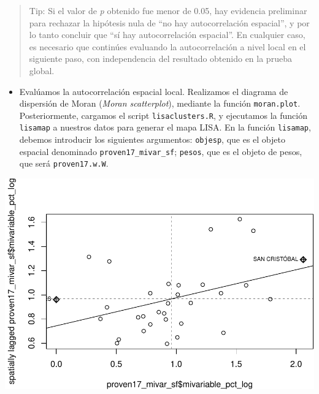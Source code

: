 \documentclass[11pt,]{article}
\newenvironment{Shaded}{\begin{snugshade}}{\end{snugshade}}
\newcommand{\KeywordTok}[1]{\textcolor[rgb]{0.13,0.29,0.53}{\textbf{#1}}}
\newcommand{\DataTypeTok}[1]{\textcolor[rgb]{0.13,0.29,0.53}{#1}}
\newcommand{\OperatorTok}[1]{\textcolor[rgb]{0.81,0.36,0.00}{\textbf{#1}}}
\newcommand{\NormalTok}[1]{#1}
\providecommand{\tightlist}{%
\setlength{\itemsep}{0pt}\setlength{\parskip}{0pt}}
\begin{document}
\begin{quote}
Tip: Si el valor de \emph{p} obtenido fue menor de 0.05, hay evidencia
preliminar para rechazar la hipótesis nula de ``no hay autocorrelación
espacial'', y por lo tanto concluir que ``sí hay autocorrelación
espacial''. En cualquier caso, es necesario que continúes evaluando la
autocorrelación a nivel local en el siguiente paso, con independencia
del resultado obtenido en la prueba global.
\end{quote}

\begin{itemize}
\tightlist
\item
  Evalúamos la autocorrelación espacial local. Realizamos el diagrama de
  dispersión de Moran (\emph{Moran scatterplot}), mediante la función
  \texttt{moran.plot}. Posteriormente, cargamos el script
  \texttt{lisaclusters.R}, y ejecutamos la función \texttt{lisamap} a
  nuestros datos para generar el mapa LISA. En la función
  \texttt{lisamap}, debemos introducir los siguientes argumentos:
  \texttt{objesp}, que es el objeto espacial denominado
  \texttt{proven17\_mivar\_sf}; \texttt{pesos}, que es el objeto de
  pesos, que será \texttt{proven17.w.W}.
\end{itemize}

\begin{Shaded}
\end{Shaded}

\includegraphics{proyecto_files/figure-latex/unnamed-chunk-25-1.pdf}
\end{document}

